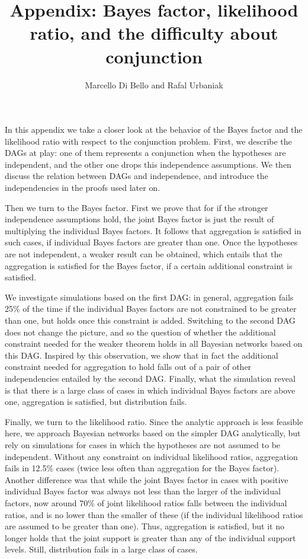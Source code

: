 \documentclass[
  10pt,
  dvipsnames,enabledeprecatedfontcommands]{scrartcl}
\title{Appendix: Bayes factor, likelihood ratio, and the difficulty
about conjunction}
\author{Marcello Di Bello and Rafal Urbaniak}
\date{}
\begin{document}
\maketitle

In this appendix we take a closer look at the behavior of the Bayes
factor and the likelihood ratio with respect to the conjunction problem.
First, we describe the \textsf{DAG}s at play: one of them represents a
conjunction when the hypotheses are independent, and the other one drops
this independence assumptions. We then discuss the relation between
\textsf{DAG}s and independence, and introduce the independencies in the
proofs used later on.

Then we turn to the Bayes factor. First we prove that for if the
stronger independence assumptions hold, the joint Bayes factor is just
the result of multiplying the individual Bayes factors. It follows that
aggregation is satisfied in such cases, if individual Bayes factors are
greater than one. Once the hypotheses are not independent, a weaker
result can be obtained, which entails that the aggregation is satisfied
for the Bayes factor, if a certain additional constraint is satisfied.

We investigate simulations based on the first \textsf{DAG}: in general,
aggregation fails 25\% of the time if the individual Bayes factors are
not constrained to be greater than one, but holds once this constraint
is added. Switching to the second \textsf{DAG} does not change the
picture, and so the question of whether the additional constraint needed
for the weaker theorem holds in all Bayesian networks based on this
\textsf{DAG}. Inspired by this observation, we show that in fact the
additional constraint needed for aggregation to hold falls out of a pair
of other independencies entailed by the second \textsf{DAG}. Finally,
what the simulation reveal is that there is a large class of cases in
which individual Bayes factors are above one, aggregation is satisfied,
but distribution fails.

Finally, we turn to the likelihood ratio. Since the analytic approach is
less feasible here, we approach Bayesian networks based on the simpler
\textsf{DAG} analytically, but rely on simulations for cases in which
the hypotheses are not assumed to be independent. Without any constraint
on individual likelihood ratios, aggregation fails in 12.5\% cases
(twice less often than aggregation for the Bayes factor). Another
difference was that while the joint Bayes factor in cases with positive
individual Bayes factor was always not less than the larger of the
individual factors, now around 70\% of joint likelihood ratios falls
between the individual ratios, and is no lower than the smaller of these
(if the individual likelihood ratios are assumed to be greater than
one). Thus, aggregation is satisfied, but it no longer holds that the
joint support is greater than any of the individual support levels.
Still, distribution fails in a large class of cases.
\end{document}
